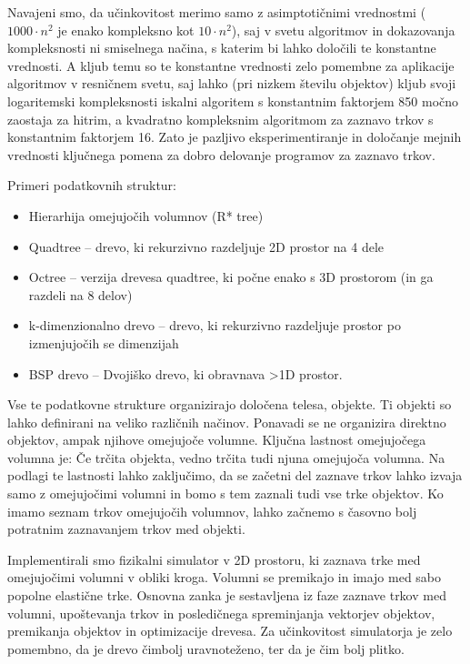\documentclass[a4paper,12pt]{article}
\begin{document}
Navajeni smo, da učinkovitost merimo samo z asimptotičnimi vrednostmi ($1000 \cdot n^2$ je enako
kompleksno kot $10 \cdot n^2$), saj v svetu algoritmov in dokazovanja kompleksnosti ni smiselnega načina,
s katerim bi lahko določili te konstantne vrednosti.
A kljub temu so te konstantne vrednosti zelo pomembne za aplikacije algoritmov v resničnem svetu,
saj lahko (pri nizkem številu objektov) kljub svoji logaritemski kompleksnosti iskalni algoritem
s konstantnim faktorjem 850 močno zaostaja za hitrim, a kvadratno kompleksnim algoritmom za zaznavo
trkov s konstantnim faktorjem 16. Zato je pazljivo eksperimentiranje in določanje mejnih vrednosti ključnega
pomena za dobro delovanje programov za zaznavo trkov.

Primeri podatkovnih struktur:
\begin{itemize}
    \item Hierarhija omejujočih volumnov (R* tree)
    \item Quadtree -- drevo, ki rekurzivno razdeljuje 2D prostor na 4 dele
    \item Octree -- verzija drevesa quadtree, ki počne enako s 3D prostorom (in ga razdeli na 8 delov)
    \item k-dimenzionalno drevo -- drevo, ki rekurzivno razdeljuje prostor po izmenjujočih se dimenzijah
    \item BSP drevo -- Dvojiško drevo, ki obravnava >1D prostor.
\end{itemize}


Vse te podatkovne strukture organizirajo določena telesa, objekte. Ti objekti so lahko definirani na veliko različnih načinov. Ponavadi se ne organizira direktno objektov, ampak njihove omejujoče volumne. Ključna lastnost omejujočega volumna je:
Če trčita objekta, vedno trčita tudi njuna omejujoča volumna.
Na podlagi te lastnosti lahko zaključimo, da se začetni del zaznave trkov lahko izvaja samo z omejujočimi volumni in bomo s tem zaznali tudi vse trke objektov.
Ko imamo seznam trkov omejujočih volumnov, lahko začnemo s časovno bolj potratnim zaznavanjem trkov med objekti.



Implementirali smo fizikalni simulator v 2D prostoru, ki zaznava trke med omejujočimi volumni
v obliki kroga. Volumni se premikajo in imajo med sabo popolne elastične trke.
Osnovna zanka je sestavljena iz faze zaznave trkov med volumni, upoštevanja trkov in posledičnega
spreminjanja vektorjev objektov, premikanja objektov in optimizacije drevesa. Za učinkovitost
simulatorja je zelo pomembno, da je drevo čimbolj uravnoteženo, ter da je čim bolj plitko.
\end{document}
